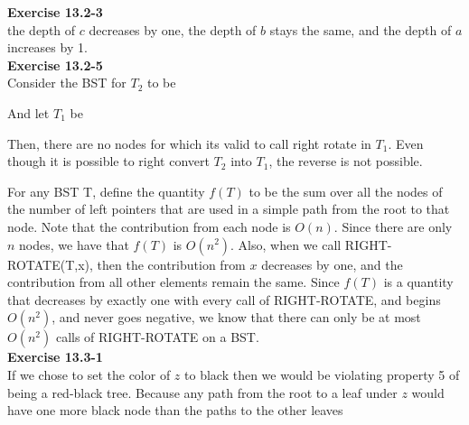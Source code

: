 \documentclass{article}
\begin{document}
\noindent\textbf{ Exercise 13.2-3} \\
the depth of $c$ decreases by one, the depth of $b$ stays the same, and the depth of $a$ increases by 1.\\


\noindent\textbf{ Exercise 13.2-5} \\
Consider the BST for $T_2$ to be


And let $T_1$ be 


Then, there are no nodes for which its valid to call right rotate in $T_1$. Even though it is possible to right convert $T_2$ into $T_1$, the reverse is not possible.


For any BST T, define the quantity $f(T)$ to be the sum over all the nodes of the number of left pointers that are used in a simple path from the root to that node. Note that the contribution from each node is $O(n)$. Since there are only $n$ nodes, we have that $f(T)$ is $O(n^2)$. Also, when we call RIGHT-ROTATE(T,x), then the contribution from $x$ decreases by one, and the contribution from all other elements remain the same. Since $f(T)$ is a quantity that decreases by exactly one with every call of RIGHT-ROTATE, and begins $O(n^2)$, and never goes negative, we know that there can only be at most $O(n^2)$ calls of RIGHT-ROTATE on a BST.\\



\noindent\textbf{ Exercise 13.3-1} \\
If we chose to set the color of $z$ to black then we would be violating property 5 of being a red-black tree. Because any path from the root to a leaf under $z$ would have one more black node than the paths to the other leaves \\
\end{document}
